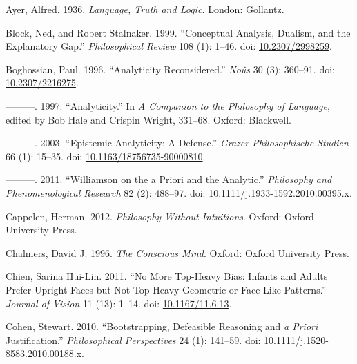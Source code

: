 \documentclass[
  11pt,
  letterpaper,
  DIV=11,
  numbers=noendperiod,
  twoside]{scrartcl}
\newlength{\cslhangindent}
\newenvironment{CSLReferences}[2] %
 {\begin{list}{}{%
  \setlength{\itemindent}{0pt}
  \setlength{\leftmargin}{0pt}
  \setlength{\parsep}{0pt}
  \ifodd #1
   \setlength{\leftmargin}{\cslhangindent}
   \setlength{\itemindent}{-1\cslhangindent}
  \fi
  \setlength{\itemsep}{#2\baselineskip}}}
 {\end{list}}
\begin{document}
\protect{}\label{refs}
\begin{CSLReferences}{1}{0}
Ayer, Alfred. 1936. \emph{Language, Truth and Logic.} London: Gollantz.

Block, Ned, and Robert Stalnaker. 1999. {``{Conceptual Analysis,
Dualism, and the Explanatory Gap}.''} \emph{Philosophical Review} 108
(1): 1--46. doi:
\href{https://doi.org/10.2307/2998259}{10.2307/2998259}.

Boghossian, Paul. 1996. {``Analyticity Reconsidered.''} \emph{No{û}s} 30
(3): 360--91. doi:
\href{https://doi.org/10.2307/2216275}{10.2307/2216275}.

---------. 1997. {``Analyticity.''} In \emph{A Companion to the
Philosophy of Language}, edited by Bob Hale and Crispin Wright, 331--68.
Oxford: Blackwell.

---------. 2003. {``Epistemic Analyticity: A Defense.''} \emph{Grazer
Philosophische Studien} 66 (1): 15--35. doi:
\href{https://doi.org/10.1163/18756735-90000810}{10.1163/18756735-90000810}.

---------. 2011. {``Williamson on the a Priori and the Analytic.''}
\emph{Philosophy and Phenomenological Research} 82 (2): 488--97. doi:
\href{https://doi.org/10.1111/j.1933-1592.2010.00395.x}{10.1111/j.1933-1592.2010.00395.x}.

Cappelen, Herman. 2012. \emph{Philosophy Without Intuitions}. Oxford:
Oxford University Press.

Chalmers, David J. 1996. \emph{The Conscious Mind}. Oxford: Oxford
University Press.

Chien, Sarina Hui-Lin. 2011. {``No More Top-Heavy Bias: Infants and
Adults Prefer Upright Faces but Not Top-Heavy Geometric or Face-Like
Patterns.''} \emph{Journal of Vision} 11 (13): 1--14. doi:
\href{https://doi.org/10.1167/11.6.13}{10.1167/11.6.13}.

Cohen, Stewart. 2010. {``Bootstrapping, Defeasible Reasoning and \emph{a
Priori} Justification.''} \emph{Philosophical Perspectives} 24 (1):
141--59. doi:
\href{https://doi.org/10.1111/j.1520-8583.2010.00188.x}{10.1111/j.1520-8583.2010.00188.x}.


\end{CSLReferences}
\end{document}
